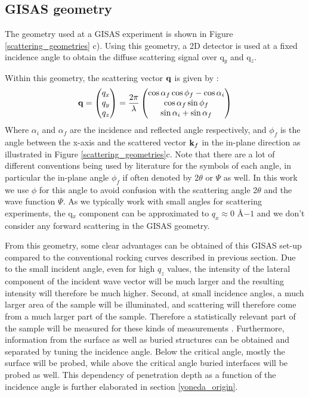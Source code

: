 \subsection{GISAS geometry}
The geometry used at a GISAS experiment is shown in Figure \ref{scattering_geometries} c). Using this geometry, a 2D detector is used at a fixed incidence angle to obtain the diffuse scattering signal over q$_y$ and q$_z$.

Within this geometry, the scattering vector $\vb{q}$ is given by \cite{GISAXS_santoro}:
\begin{equation}\label{qvector_gisaxs}
	\vb{q} =     \begin{pmatrix}
		q_x \\
		q_y \\
		q_z
	\end{pmatrix}
= \frac{2\pi}{\lambda}  \begin{pmatrix}
	\cos{\alpha_f} \cos{\phi_f} - \cos{\alpha_i} \\
	\cos{\alpha_f} \sin{\phi_f} \\
	\sin{\alpha_i} + \sin{\alpha_f}
\end{pmatrix}
\end{equation}
Where $\alpha_i$ and $\alpha_f$ are the incidence and reflected angle respectively, and $\phi_f$ is the angle between the x-axis and the scattered vector $\vb{k}_f$ in the in-plane direction as illustrated in Figure \ref{scattering_geometries}c. Note that there are a lot of different conventions being used by literature for the symbols of each angle, in particular the in-plane angle $\phi_f$ if often denoted by $2\theta$ or $\Psi$ as well. In this work we use $\phi$ for this angle to avoid confusion with the scattering angle 2$\theta$ and the wave function $\Psi$. As we typically work with small angles for scattering experiments, the q$_x$ component can be approximated to $q_x \approx 0$ $Å{-1}$ and we don't consider any forward scattering in the GISAS geometry.

From this geometry, some clear advantages can be obtained of this GISAS set-up compared to the conventional rocking curves described in previous section. Due to the small incident angle, even for high $q_z$ values, the intensity of the lateral component of the incident wave vector will be much larger and the resulting intensity will therefore be much higher. Second, at small incidence angles, a much larger area of the sample will be illuminated, and scattering will therefore come from a much larger part of the sample. Therefore a statistically relevant part of the sample will be measured for these kinds of measurements  \cite{GISAXS_santoro}. Furthermore, information from the surface as well as buried structures can be obtained and separated by tuning the incidence angle. Below the critical angle, mostly the surface will be probed, while above the critical angle buried interfaces will be probed as well. This dependency of penetration depth as a function of the incidence angle is further elaborated in section \ref{yoneda_origin}.
